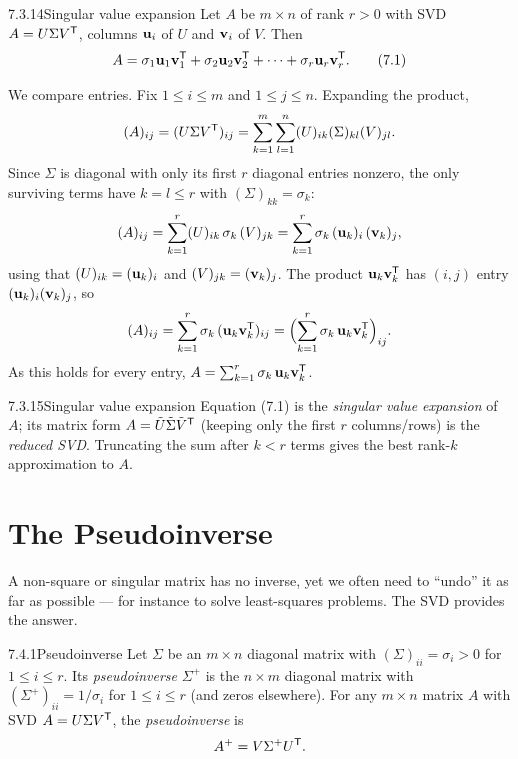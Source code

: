 \begin{thms}{7.3.14}{Singular value expansion}
Let $A$ be $m\times n$ of rank $r>0$ with SVD $A=U\Sigma V^{\mathsf{T}}$, columns $\mathbf{u}_i$ of $U$ and $\mathbf{v}_i$ of $V$. Then
\[
A=\sigma_1\mathbf{u}_1\mathbf{v}_1^{\mathsf{T}}+\sigma_2\mathbf{u}_2\mathbf{v}_2^{\mathsf{T}}+\cdots+\sigma_r\mathbf{u}_r\mathbf{v}_r^{\mathsf{T}}. \tag{7.1}
\]
\end{thms}

\begin{prf}
We compare entries. Fix $1\le i\le m$ and $1\le j\le n$. Expanding the product,
\[
(A)_{ij}=(U\Sigma V^{\mathsf{T}})_{ij}=\sum_{k=1}^{m}\sum_{l=1}^{n}(U)_{ik}(\Sigma)_{kl}(V)_{jl}.
\]
Since $\Sigma$ is diagonal with only its first $r$ diagonal entries nonzero, the only surviving terms have $k=l\le r$ with $(\Sigma)_{kk}=\sigma_k$:
\[
(A)_{ij}=\sum_{k=1}^{r}(U)_{ik}\,\sigma_k\,(V)_{jk}=\sum_{k=1}^{r}\sigma_k\,(\mathbf{u}_k)_i\,(\mathbf{v}_k)_j,
\]
using that $(U)_{ik}=(\mathbf{u}_k)_i$ and $(V)_{jk}=(\mathbf{v}_k)_j$. The product $\mathbf{u}_k\mathbf{v}_k^{\mathsf{T}}$ has $(i,j)$ entry $(\mathbf{u}_k)_i(\mathbf{v}_k)_j$, so
\[
(A)_{ij}=\sum_{k=1}^{r}\sigma_k\,(\mathbf{u}_k\mathbf{v}_k^{\mathsf{T}})_{ij}=\Bigl(\sum_{k=1}^{r}\sigma_k\,\mathbf{u}_k\mathbf{v}_k^{\mathsf{T}}\Bigr)_{ij}.
\]
As this holds for every entry, $A=\sum_{k=1}^{r}\sigma_k\,\mathbf{u}_k\mathbf{v}_k^{\mathsf{T}}$.
\end{prf}

\begin{defns}{7.3.15}{Singular value expansion}
Equation \textup{(7.1)} is the \emph{singular value expansion} of $A$; its matrix form $A=\tilde U\tilde\Sigma\tilde V^{\mathsf{T}}$ (keeping only the first $r$ columns/rows) is the \emph{reduced SVD}. Truncating the sum after $k<r$ terms gives the best rank-$k$ approximation to $A$.
\end{defns}

\section{The Pseudoinverse}
\label{sec:7.4}

A non-square or singular matrix has no inverse, yet we often need to ``undo'' it as far as possible --- for instance to solve least-squares problems. The SVD provides the answer.

\begin{defns}{7.4.1}{Pseudoinverse}
Let $\Sigma$ be an $m\times n$ diagonal matrix with $(\Sigma)_{ii}=\sigma_i>0$ for $1\le i\le r$. Its \emph{pseudoinverse} $\Sigma^+$ is the $n\times m$ diagonal matrix with $(\Sigma^+)_{ii}=1/\sigma_i$ for $1\le i\le r$ (and zeros elsewhere). For any $m\times n$ matrix $A$ with SVD $A=U\Sigma V^{\mathsf{T}}$, the \emph{pseudoinverse} is
\[
A^+=V\Sigma^+U^{\mathsf{T}}.
\]
\end{defns}

